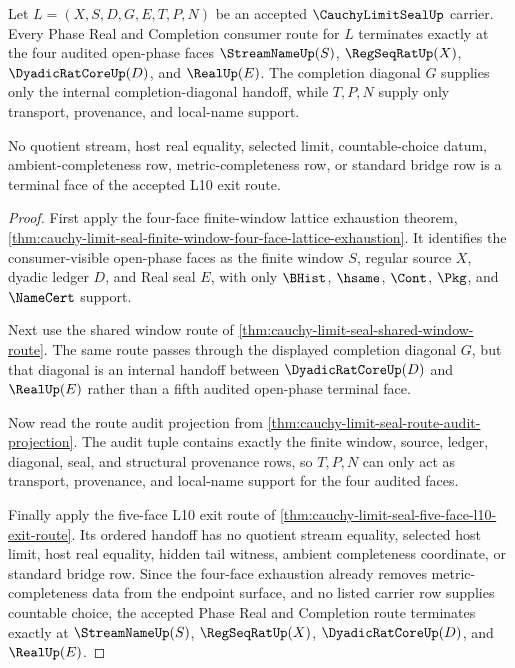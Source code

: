 \begin{theorem}
\label{thm:cauchy-limit-seal-l10-four-face-terminality}
Let $L=(X,S,D,G,E,T,P,N)$ be an accepted $\CauchyLimitSealUp$ carrier. Every Phase Real and Completion consumer route for $L$ terminates exactly at the four audited open-phase faces $\StreamNameUp(S)$, $\RegSeqRatUp(X)$, $\DyadicRatCoreUp(D)$, and $\RealUp(E)$. The completion diagonal $G$ supplies only the internal completion-diagonal handoff, while $T,P,N$ supply only transport, provenance, and local-name support.

No quotient stream, host real equality, selected limit, countable-choice datum, ambient-completeness row, metric-completeness row, or standard bridge row is a terminal face of the accepted L10 exit route.
\end{theorem}
\begin{proof}
First apply the four-face finite-window lattice exhaustion theorem, \autoref{thm:cauchy-limit-seal-finite-window-four-face-lattice-exhaustion}. It identifies the consumer-visible open-phase faces as the finite window $S$, regular source $X$, dyadic ledger $D$, and Real seal $E$, with only $\BHist$, $\hsame$, $\Cont$, $\Pkg$, and $\NameCert$ support.

Next use the shared window route of \autoref{thm:cauchy-limit-seal-shared-window-route}. The same route passes through the displayed completion diagonal $G$, but that diagonal is an internal handoff between $\DyadicRatCoreUp(D)$ and $\RealUp(E)$ rather than a fifth audited open-phase terminal face.

Now read the route audit projection from \autoref{thm:cauchy-limit-seal-route-audit-projection}. The audit tuple contains exactly the finite window, source, ledger, diagonal, seal, and structural provenance rows, so $T,P,N$ can only act as transport, provenance, and local-name support for the four audited faces.

Finally apply the five-face L10 exit route of \autoref{thm:cauchy-limit-seal-five-face-l10-exit-route}. Its ordered handoff has no quotient stream equality, selected host limit, host real equality, hidden tail witness, ambient completeness coordinate, or standard bridge row. Since the four-face exhaustion already removes metric-completeness data from the endpoint surface, and no listed carrier row supplies countable choice, the accepted Phase Real and Completion route terminates exactly at $\StreamNameUp(S)$, $\RegSeqRatUp(X)$, $\DyadicRatCoreUp(D)$, and $\RealUp(E)$.
\end{proof}

